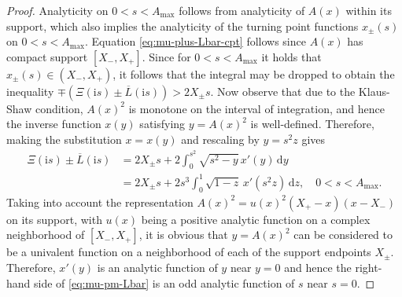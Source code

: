 \documentclass[12pt]{amsart}
\numberwithin{equation}{section}
\newcommand{\dd}{\mathrm{d}}
\newcommand{\ii}{\mathrm{i}}
\newcommand{\tailint}{\Xi}
\begin{document}
\begin{proof}
Analyticity on $0<s<A_\mathrm{max}$ follows from analyticity of $A(x)$ within its support, which also implies the analyticity of the turning point functions $x_\pm(s)$ on $0<s<A_\mathrm{max}$.  Equation \ref{eq:mu-plus-Lbar-cpt} 
follows since $A(x)$ has compact support $[X_-,X_+]$.
Since for $0<s<A_\mathrm{max}$ it holds that $x_\pm(s)\in (X_-,X_+)$, it follows that the integral may be dropped to obtain the inequality $\mp(\tailint(\ii s)\pm\overline{L}(\ii s))>2X_\pm s$.
Now observe that due to the Klaus-Shaw condition, $A(x)^2$ is monotone on the interval of integration, and hence the inverse function $x(y)$ satisfying $y=A(x)^2$ is well-defined.  Therefore, making the substitution $x=x(y)$ and rescaling by $y=s^2z$ gives
\begin{equation}
\begin{split}
\tailint(\ii s)\pm\overline{L}(\ii s)&=2X_\pm s + 2\int_0^{s^2}\sqrt{s^2-y}\,x'(y)\,\dd y\\
&=2X_\pm s + 2s^3\int_0^1\sqrt{1-z}\,x'(s^2z)\,\dd z,\quad 0<s<A_\mathrm{max}.
\end{split}
\label{eq:mu-pm-Lbar}
\end{equation}
Taking into account the representation $A(x)^2=u(x)^2(X_+-x)(x-X_-)$ on its support, with $u(x)$ being a positive analytic function on a complex neighborhood of $[X_-,X_+]$, it is obvious that $y=A(x)^2$ can be considered to be a univalent function on a neighborhood of each of the support endpoints $X_\pm$.  Therefore, $x'(y)$ is an analytic function of $y$ near $y=0$ and hence the right-hand side of \eqref{eq:mu-pm-Lbar} is an odd analytic function of $s$ near $s=0$.
\end{proof}
\end{document}
